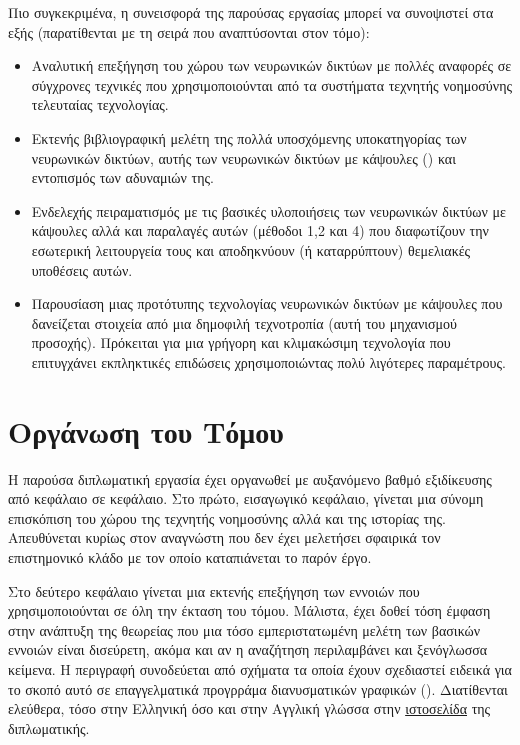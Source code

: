 Πιο συγκεκριμένα, η συνεισφορά της παρούσας εργασίας μπορεί να συνοψιστεί στα εξής (παρατίθενται με τη σειρά που αναπτύσονται στον τόμο):
\begin{itemize}
  \item Αναλυτική επεξήγηση του χώρου των νευρωνικών δικτύων με πολλές αναφορές σε σύγχρονες τεχνικές που χρησιμοποιούνται από τα συστήματα τεχνητής νοημοσύνης τελευταίας τεχνολογίας.
  \item Εκτενής βιβλιογραφική μελέτη της πολλά υποσχόμενης υποκατηγορίας των νευρωνικών δικτύων, αυτής των νευρωνικών δικτύων με κάψουλες () και εντοπισμός των αδυναμιών της.
  \item Ενδελεχής πειραματισμός με τις βασικές υλοποιήσεις των νευρωνικών δικτύων με κάψουλες αλλά και παραλαγές αυτών (μέθοδοι 1,2 και 4) που διαφωτίζουν την εσωτερική λειτουργεία τους και αποδηκνύουν (ή καταρρύπτουν) θεμελιακές υποθέσεις αυτών.
  \item Παρουσίαση μιας προτότυπης τεχνολογίας νευρωνικών δικτύων με κάψουλες που δανείζεται στοιχεία από μια δημοφιλή τεχνοτροπία (αυτή του μηχανισμού προσοχής). Πρόκειται για μια γρήγορη και κλιμακώσιμη τεχνολογία που επιτυγχάνει εκπληκτικές επιδώσεις χρησιμοποιώντας πολύ λιγότερες παραμέτρους.
\end{itemize}

\section{Οργάνωση του Τόμου}
Η παρούσα διπλωματική εργασία έχει οργανωθεί με αυξανόμενο βαθμό εξιδίκευσης από κεφάλαιο σε κεφάλαιο. Στο πρώτο, εισαγωγικό κεφάλαιο, γίνεται μια σύνομη επισκόπιση του χώρου της τεχνητής νοημοσύνης αλλά και της ιστορίας της. Απευθύνεται κυρίως στον αναγνώστη που δεν έχει μελετήσει σφαιρικά τον επιστημονικό κλάδο με τον οποίο καταπιάνεται το παρόν έργο.\par

Στο δεύτερο κεφάλαιο γίνεται μια εκτενής επεξήγηση των εννοιών που χρησιμοποιούνται σε όλη την έκταση του τόμου. Μάλιστα, έχει δοθεί τόση έμφαση στην ανάπτυξη της θεωρείας που μια τόσο εμπεριστατωμένη μελέτη των βασικών εννοιών είναι δισεύρετη, ακόμα και αν η αναζήτηση περιλαμβάνει και ξενόγλωσσα κείμενα. Η περιγραφή συνοδεύεται από σχήματα τα οποία έχουν σχεδιαστεί ειδεικά για το σκοπό αυτό σε επαγγελματικά προγρράμα διανυσματικών γραφικών (). Διατίθενται ελεύθερα, τόσο στην Ελληνική όσο και στην Αγγλική γλώσσα στην \href{https://github.com/abarmper/Thesis_Barmperis}{ιστοσελίδα} της διπλωματικής.\par

